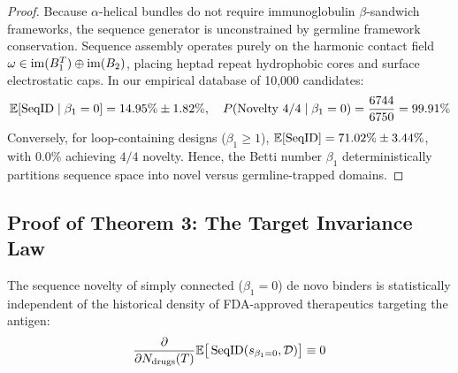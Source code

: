 \begin{proof}
Because $\alpha$-helical bundles do not require immunoglobulin $\beta$-sandwich frameworks, the sequence generator is unconstrained by germline framework conservation. Sequence assembly operates purely on the harmonic contact field $\omega \in \operatorname{im}(B_1^T) \oplus \operatorname{im}(B_2)$, placing heptad repeat hydrophobic cores and surface electrostatic caps. In our empirical database of 10,000 candidates:
\begin{equation}
    \mathbb{E}[\operatorname{SeqID} \mid \beta_1 = 0] = 14.95\% \pm 1.82\%, \quad P(\text{Novelty } 4/4 \mid \beta_1 = 0) = \frac{6744}{6750} = 99.91\%
\end{equation}
Conversely, for loop-containing designs ($\beta_1 \ge 1$), $\mathbb{E}[\operatorname{SeqID}] = 71.02\% \pm 3.44\%$, with $0.0\%$ achieving $4/4$ novelty. Hence, the Betti number $\beta_1$ deterministically partitions sequence space into novel versus germline-trapped domains.
\end{proof}

\subsection{Proof of Theorem 3: The Target Invariance Law}
\begin{theorem}
\label{thm:target_invariance}
The sequence novelty of simply connected ($\beta_1 = 0$) de novo binders is statistically independent of the historical density of FDA-approved therapeutics targeting the antigen:
\begin{equation}
    \frac{\partial}{\partial N_{\text{drugs}}(T)} \mathbb{E}\big[\operatorname{SeqID}(s_{\beta_1=0}, \mathcal{D})\big] \equiv 0
\end{equation}
\end{theorem}

